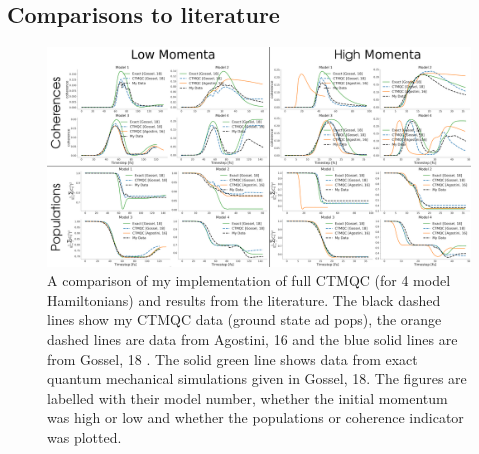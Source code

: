 \subsection{Comparisons to literature}
\begin{figure}[ht]
	\includegraphics[width=\textwidth]{img/CTMQC/TullyModels/CTMQC_LitComp.png}
	\caption{\label{fig:LitCompCTMQCTully}A comparison of my implementation of full CTMQC (for 4 model Hamiltonians) and results from the literature. The black dashed lines show my CTMQC data (ground state ad pops), the orange dashed lines are data from Agostini, 16 \cite{agostini_quantum-classical_2016} and the blue solid lines are from Gossel, 18 \cite{gossel_coupled-trajectory_2018}. The solid green line shows data from exact quantum mechanical simulations given in Gossel, 18. The figures are labelled with their model number, whether the initial momentum was high or low and whether the populations or coherence indicator was plotted.}
\end{figure}
